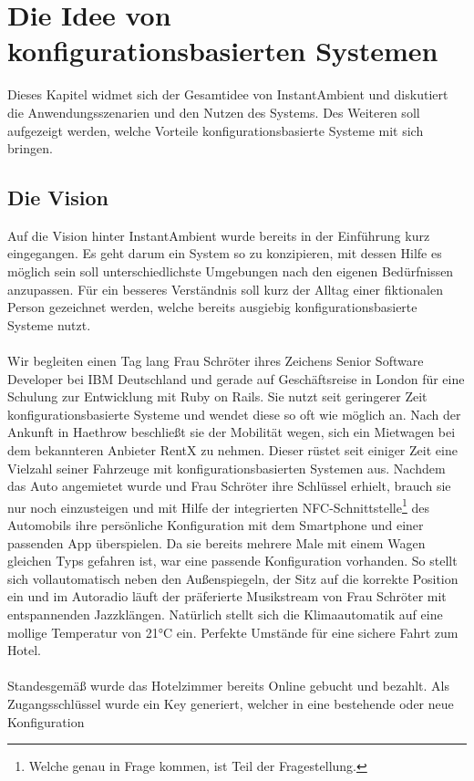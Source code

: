 \chapter{Die Idee von konfigurationsbasierten Systemen}

Dieses Kapitel widmet sich der Gesamtidee von InstantAmbient und diskutiert die Anwendungsszenarien und den Nutzen des Systems. Des Weiteren soll aufgezeigt werden, welche 
Vorteile konfigurationsbasierte Systeme mit sich bringen. 

\section{Die Vision}
Auf die Vision hinter InstantAmbient wurde bereits in der Einführung kurz eingegangen. Es geht darum ein System so zu konzipieren, mit dessen Hilfe es möglich sein soll 
unterschiedlichste Umgebungen nach den eigenen Bedürfnissen anzupassen. Für ein besseres Verständnis soll kurz der Alltag einer fiktionalen Person gezeichnet werden, welche
bereits ausgiebig konfigurationsbasierte Systeme nutzt. 
\\\\
Wir begleiten einen Tag lang Frau Schröter ihres Zeichens Senior Software Developer bei IBM Deutschland und gerade auf Geschäftsreise in London für eine Schulung zur 
Entwicklung mit Ruby on Rails. Sie nutzt seit geringerer Zeit konfigurationsbasierte Systeme und wendet diese so oft wie möglich an. Nach der Ankunft in Haethrow beschließt 
sie der Mobilität wegen, sich ein Mietwagen bei dem bekannteren Anbieter RentX zu nehmen. Dieser rüstet seit einiger Zeit eine Vielzahl seiner Fahrzeuge mit 
konfigurationsbasierten Systemen aus. Nachdem das Auto angemietet wurde und Frau Schröter ihre Schlüssel erhielt, brauch sie nur noch einzusteigen und mit Hilfe der 
integrierten NFC-Schnittstelle\footnote{Welche genau in Frage kommen, ist Teil der Fragestellung.} des Automobils ihre persönliche Konfiguration mit dem Smartphone und einer 
passenden App überspielen. Da sie bereits mehrere Male mit einem Wagen gleichen Typs gefahren ist, war eine passende Konfiguration vorhanden. So stellt sich vollautomatisch
neben den Außenspiegeln, der Sitz auf die korrekte Position ein und im Autoradio läuft der präferierte Musikstream von Frau Schröter mit entspannenden Jazzklängen. Natürlich
stellt sich die Klimaautomatik auf eine mollige Temperatur von 21°C ein. Perfekte Umstände für eine sichere Fahrt zum Hotel.
\\\\
Standesgemäß wurde das Hotelzimmer bereits Online gebucht und bezahlt. Als Zugangsschlüssel wurde ein Key generiert, welcher in eine bestehende oder neue Konfiguration 
